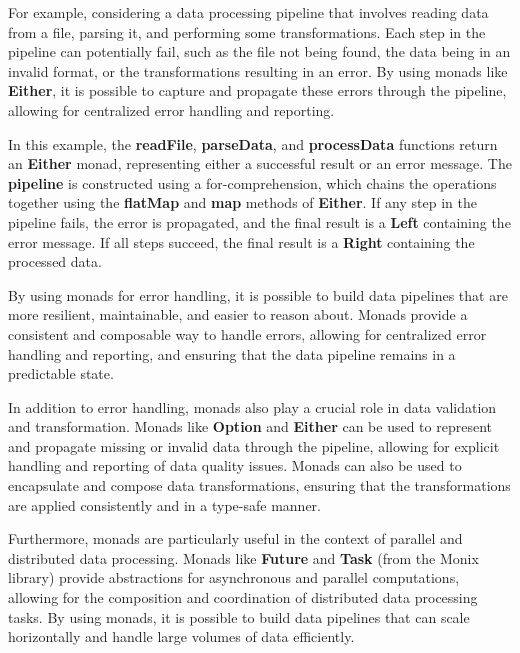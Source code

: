 For example, considering a data processing pipeline that involves reading data from a file, parsing it, and performing some transformations. Each step in the pipeline can potentially fail, such as the file not being found, the data being in an invalid format, or the transformations resulting in an error. By using monads like \textbf{Either}, it is possible to capture and propagate these errors through the pipeline, allowing for centralized error handling and reporting.



In this example, the \textbf{readFile}, \textbf{parseData}, and \textbf{processData} functions return an \textbf{Either} monad, representing either a successful result or an error message. The \textbf{pipeline} is constructed using a for-comprehension, which chains the operations together using the \textbf{flatMap} and \textbf{map} methods of \textbf{Either}. If any step in the pipeline fails, the error is propagated, and the final result is a \textbf{Left} containing the error message. If all steps succeed, the final result is a \textbf{Right} containing the processed data.

By using monads for error handling, it is possible to build data pipelines that are more resilient, maintainable, and easier to reason about. Monads provide a consistent and composable way to handle errors, allowing for centralized error handling and reporting, and ensuring that the data pipeline remains in a predictable state.

In addition to error handling, monads also play a crucial role in data validation and transformation. Monads like \textbf{Option} and \textbf{Either} can be used to represent and propagate missing or invalid data through the pipeline, allowing for explicit handling and reporting of data quality issues. Monads can also be used to encapsulate and compose data transformations, ensuring that the transformations are applied consistently and in a type-safe manner.

Furthermore, monads are particularly useful in the context of parallel and distributed data processing. Monads like \textbf{Future} and \textbf{Task} (from the Monix library) provide abstractions for asynchronous and parallel computations, allowing for the composition and coordination of distributed data processing tasks. By using monads, it is possible to build data pipelines that can scale horizontally and handle large volumes of data efficiently. \footnotemark {} \footnotemark {} \footnotemark {} \footnotemark {}

